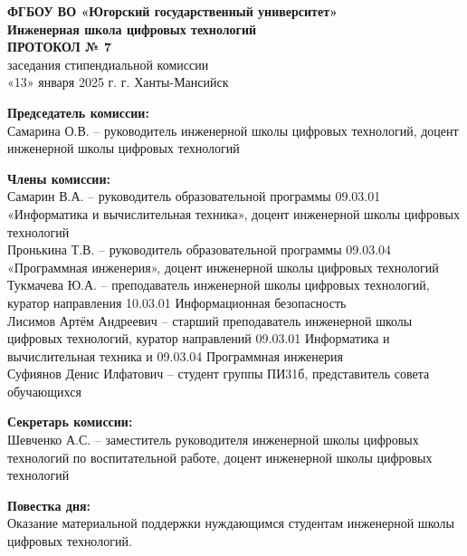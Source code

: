 \documentclass[a4paper,12pt]{article}
\begin{document}
\begin{center}
    \textbf{ФГБОУ ВО «Югорский государственный университет»} \\
    \textbf{Инженерная школа цифровых технологий} \\
    \vspace{0.5cm}
    \textbf{ПРОТОКОЛ № 7} \\
    заседания стипендиальной комиссии \\
    «13» января 2025 г. \quad г. Ханты-Мансийск
\end{center}

\vspace{1cm}

\noindent
\textbf{Председатель комиссии:} \\
Самарина О.В. -- руководитель инженерной школы цифровых технологий, доцент инженерной школы цифровых технологий \\
\vspace{0.5cm}

\noindent
\textbf{Члены комиссии:} \\
Самарин В.А. -- руководитель образовательной программы 09.03.01 «Информатика и вычислительная техника», доцент инженерной школы цифровых технологий \\
Пронькина Т.В. -- руководитель образовательной программы 09.03.04 «Программная инженерия», доцент инженерной школы цифровых технологий \\
Тукмачева Ю.А. -- преподаватель инженерной школы цифровых технологий, куратор направления 10.03.01 Информационная безопасность \\
Лисимов Артём Андреевич -- старший преподаватель инженерной школы цифровых технологий, куратор направлений 09.03.01 Информатика и вычислительная техника и 09.03.04 Программная инженерия \\
Суфиянов Денис Илфатович -- студент группы ПИ31б, представитель совета обучающихся \\
\vspace{0.5cm}

\noindent
\textbf{Секретарь комиссии:} \\
Шевченко А.С. -- заместитель руководителя инженерной школы цифровых технологий по воспитательной работе, доцент инженерной школы цифровых технологий \\
\vspace{0.5cm}

\noindent
\textbf{Повестка дня:} \\
Оказание материальной поддержки нуждающимся студентам инженерной школы цифровых технологий.
\end{document}
